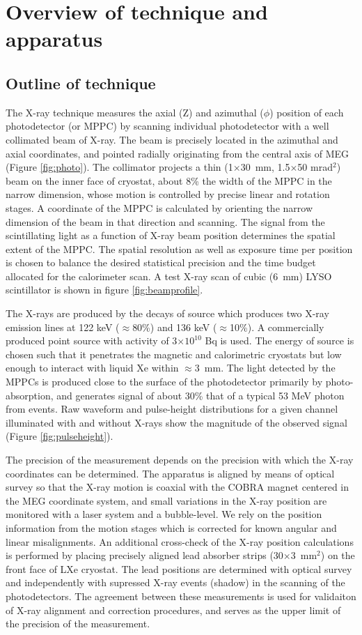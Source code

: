 \section{\label{section3}Overview of technique and apparatus}
\subsection{Outline of technique}
The X-ray technique measures the axial (Z) and azimuthal ($\phi$)
position of each photodetector (or MPPC) by scanning individual
photodetector with a well collimated beam of X-ray. The beam is
precisely located in the azimuthal and axial coordinates, and pointed
radially originating from the central axis of MEG (Figure
\ref{fig:photo}).  The collimator projects a thin (1$\times$30~mm, 1.5$\times$50
mrad$^2$) beam on the inner face of cryostat, about 8\% the width of
the MPPC in the narrow dimension, whose motion is controlled by
precise linear and rotation stages. A coordinate of the
MPPC is calculated by orienting the narrow dimension of the beam in
that direction and scanning. The signal from the scintillating light
as a function of X-ray beam position determines the spatial extent of
the MPPC. The spatial resolution as well as exposure time per position
is chosen to balance the desired statistical precision and the time
budget allocated for the calorimeter scan. A test X-ray scan of cubic
(6~mm) LYSO scintillator is shown in figure \ref{fig:beamprofile}.

The X-rays are produced by the decays of \cob source which produces
two X-ray emission lines at 122 keV ($\approx$80\%) and 136 keV
($\approx$10\%).  A commercially produced point source with
activity of 3$\times 10^{10}$ Bq is used. The energy of source is
chosen such that it penetrates the magnetic and calorimetric cryostats
but low enough to interact with liquid Xe within $\approx$3~mm. The light
detected by the MPPCs is produced close to the surface of the
photodetector primarily by photo-absorption, and generates signal of
about 30\% that of a typical 53 MeV photon from \mueg events. Raw
waveform and pulse-height distributions for a given channel
illuminated with and without X-rays show the magnitude of the observed
signal (Figure \ref{fig:pulseheight}).

The precision of the measurement depends on the precision with which
the X-ray coordinates can be determined. 
The apparatus is aligned by means of optical survey so that the X-ray 
motion is coaxial with the COBRA magnet centered in the MEG coordinate system, 
and small variations in the X-ray position are monitored with a laser system 
and a bubble-level. 
We rely on the position information from the motion stages which is corrected
for known angular and linear misalignments. 
An additional cross-check of the X-ray position calculations is performed 
by placing precisely aligned lead absorber strips (30$\times$3~mm$^2$) on the 
front face of LXe cryostat. 
The lead positions are determined with optical
survey and independently with supressed X-ray events (shadow)
in the scanning of the photodetectors.
The agreement between these measurements is used for validaiton of X-ray 
alignment and correction procedures, and serves as the upper limit of the precision 
of the measurement. 

